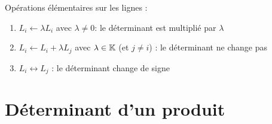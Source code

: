 \begin{frame}

\begin{theoreme}
\end{theoreme}

\pause
\bigskip

\begin{remarque}
Opérations élémentaires sur les lignes :
\begin{enumerate}
  \item\pause $L_i \leftarrow \lambda L_i$ avec $\lambda \neq 0$: le déterminant est 
  multiplié par $\lambda$
  
  \item\pause $L_i \leftarrow L_i+\lambda L_j$ avec $\lambda \in \mathbb{K}$ (et $j\neq i$) :
  le déterminant ne change pas
  
  \item\pause $L_i \leftrightarrow L_j$ : le déterminant change de signe
\end{enumerate} 
\end{remarque}

\end{frame}

\section{Déterminant d'un produit}


